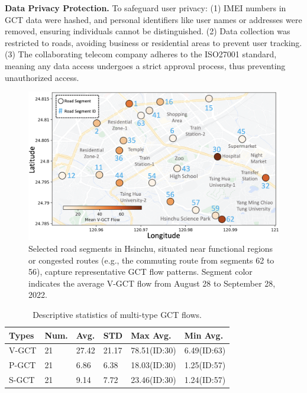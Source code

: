 \documentclass[letterpaper]{article} %
\begin{document}
\noindent \textbf{Data Privacy Protection.} 
To safeguard user privacy: (1) IMEI numbers in GCT data were hashed, and personal identifiers like user names or addresses were removed, ensuring individuals cannot be distinguished. (2) Data collection was restricted to roads, avoiding business or residential areas to prevent user tracking. (3) The collaborating telecom company adheres to the ISO27001 standard, meaning any data access undergoes a strict approval process, thus preventing unauthorized access.
\begin{figure}[h]
\centering
\includegraphics[width=0.95\linewidth]{Figure/road_segments.png}
\caption{Selected road segments in Hsinchu, situated near functional regions or congested routes (e.g., the commuting route from segments 62 to 56), capture representative GCT flow patterns. Segment color indicates the average V-GCT flow from August 28 to September 28, 2022.}
\label{fig_road_segments}
\end{figure}
\begin{table}[ht]
  \small
  \begin{tabular}{p{0.95cm} p{0.63cm} p{0.63cm} p{0.63cm} p{1.4cm} p{1.4cm}}
   \hline
    \textbf{Types}  &  \textbf{Num.} &   \textbf{Avg.} & \textbf{STD}  &  \textbf{Max Avg.} & \textbf{Min Avg.}  \\
   \hline
    V-GCT &  21 & 27.42 & 21.17 & 78.51(ID:30) & 6.49(ID:63) \\
    P-GCT &  21 & 6.86 & 6.38 & 18.03(ID:30) & 1.25(ID:57) \\
    S-GCT &  21 & 9.14 & 7.72 & 23.46(ID:30) & 1.24(ID:57) \\
   \hline
  \end{tabular}
  \caption{Descriptive statistics of multi-type GCT flows.}
  \label{tab:statistics}
\end{table}
\end{document}
